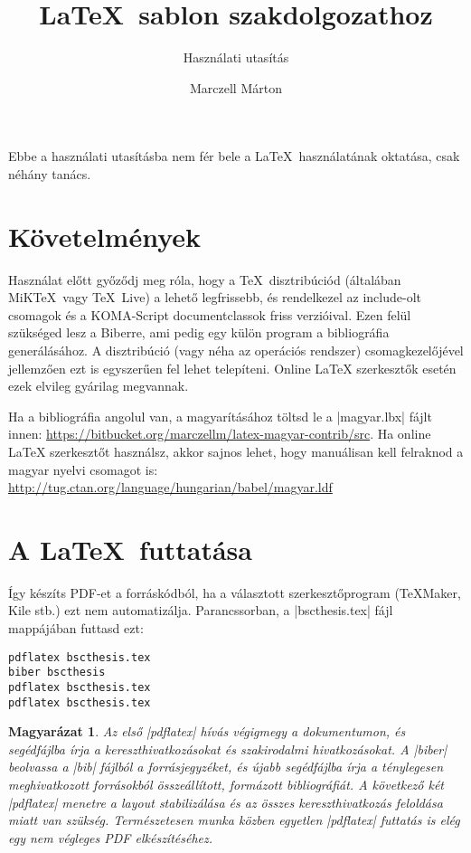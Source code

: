 \documentclass{scrartcl}
\title{\LaTeX\ sablon szakdolgozathoz}
\subtitle{Használati utasítás}
\author{Marczell Márton}
\theoremstyle{fineprint}
\newtheorem*{explanation}{Magyarázat}
\begin{document}
\maketitle
Ebbe a használati utasításba nem fér bele a \LaTeX\ használatának oktatása, csak néhány tanács.

\section{Követelmények}
Használat előtt győződj meg róla, hogy a \TeX\ disztribúciód (általában MiK\TeX\ vagy \TeX\ Live) a lehető legfrissebb, és rendelkezel az include-olt csomagok és a KOMA-Script documentclassok friss verzióival. Ezen felül szükséged lesz a Biberre, ami pedig egy külön program a bibliográfia generálásához. A disztribúció (vagy néha az operációs rendszer) csomagkezelőjével jellemzően ezt is egyszerűen fel lehet telepíteni. Online LaTeX szerkesztők esetén ezek elvileg gyárilag megvannak.

Ha a bibliográfia angolul van, a magyarításához töltsd le a |magyar.lbx| fájlt innen: \url{https://bitbucket.org/marczellm/latex-magyar-contrib/src}. Ha online LaTeX szerkesztőt használsz, akkor sajnos lehet, hogy manuálisan kell felraknod a magyar nyelvi csomagot is: \url{http://tug.ctan.org/language/hungarian/babel/magyar.ldf}

\section{A \LaTeX\ futtatása}
Így készíts PDF-et a forráskódból, ha a választott szerkesztőprogram (\TeX{Maker}, Kile stb.) ezt nem automatizálja. Parancssorban, a |bscthesis.tex| fájl mappájában futtasd ezt:
\begin{lstlisting}
pdflatex bscthesis.tex
biber bscthesis
pdflatex bscthesis.tex
pdflatex bscthesis.tex
\end{lstlisting}

\begin{explanation}
Az első |pdflatex| hívás végigmegy a dokumentumon, és segédfájlba írja a kereszthivatkozásokat és szakirodalmi hivatkozásokat. A |biber| beolvassa a |bib| fájlból a forrásjegyzéket, és újabb segédfájlba írja a ténylegesen meghivatkozott forrásokból összeállított, formázott bibliográfiát. A következő két |pdflatex| menetre a layout stabilizálása és az összes kereszthivatkozás feloldása miatt van szükség. Természetesen munka közben egyetlen |pdflatex| futtatás is elég egy nem végleges PDF elkészítéséhez.
\end{explanation}
\end{document}
